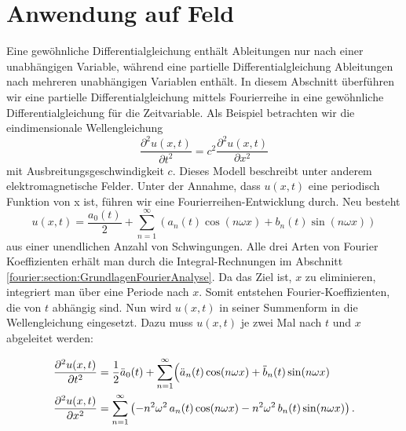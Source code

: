 %
%
%
%



\section{Anwendung auf Feld\label{fourier:section:AnwendungAufFeld}}

Eine gewöhnliche Differentialgleichung enthält Ableitungen nur nach einer unabhängigen Variable, während eine partielle Differentialgleichung Ableitungen nach mehreren unabhängigen Variablen enthält.  
In diesem Abschnitt überführen wir eine partielle Differentialgleichung mittels Fourierreihe in eine gewöhnliche Differentialgleichung für die Zeitvariable.
Als Beispiel betrachten wir die eindimensionale Wellengleichung  
\begin{equation}\label{eq:wellengleichung}
	\frac{\partial^2 u(x,t)}{\partial t^2} = c^2 \frac{\partial^2 u(x,t)}{\partial x^2}
\end{equation}  
mit Ausbreitungsgeschwindigkeit $c$. Dieses Modell beschreibt unter anderem elektromagnetische Felder.  
Unter der Annahme, dass $u(x, t)$ eine periodisch Funktion von x ist, führen wir eine Fourierreihen-Entwicklung durch. 
Neu besteht 
\begin{equation}
	u(x,t) = \frac{a_0(t)}{2} + \sum_{n=1}^{\infty} \left( a_n(t) \cos(n \omega x) + b_n(t) \sin(n \omega x) \right)
\end{equation}
aus einer unendlichen Anzahl von Schwingungen.
Alle drei Arten von Fourier Koeffizienten erhält man durch die Integral-Rechnungen im Abschnitt \ref{fourier:section:GrundlagenFourierAnalyse}. 
Da das Ziel ist, $x$ zu eliminieren, integriert man über eine Periode nach $x$.
Somit entstehen Fourier-Koeffizienten, die von $t$ abhängig sind. 
Nun wird $u(x,t)$ in seiner Summenform in die Wellengleichung eingesetzt. 
Dazu muss $u(x,t)$ je zwei Mal nach $t$ und $x$ abgeleitet werden:

\begin{equation}
	\begin{aligned}
		\frac{\partial^2 u(x,t)}{\partial t^2}
		&= \frac{1}{2}\ddot{a}_0(t) + \sum_{n=1}^{\infty}\Bigl(\ddot{a}_n(t)\cos(n\omega x)+ \ddot{b}_n(t)\sin(n\omega x)
		\\
		\frac{\partial^2 u(x,t)}{\partial x^2}
		&= \sum_{n=1}^{\infty}\left(-n^2\omega^2\,a_n(t)\cos(n\omega x)-n^2\omega^2\,b_n(t)\sin(n\omega x)\right).
	\end{aligned}
\end{equation}

